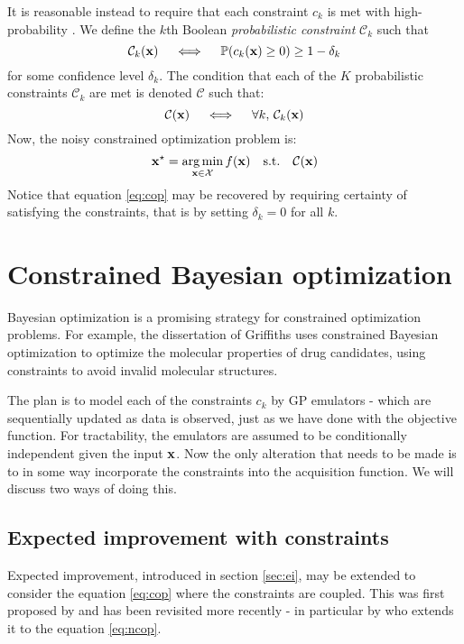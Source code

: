 It is reasonable instead to require that each constraint $c_k$ is met with high-probability \cite{gelbart}. We define the $k$th Boolean \textit{probabilistic constraint} $\mathcal{C}_k$ such that
%
\begin{equation}
\mathcal{C}_k(\mathbf{x}) \quad \iff \quad \mathbb{P}(c_{k}(\mathbf{x})\geq 0) \geq 1 - \delta_k
\end{equation}
%
for some confidence level $\delta_k$. The condition that each of the $K$ probabilistic constraints $\mathcal{C}_k$ are met is denoted $\mathcal{C}$ such that: 
%
\begin{equation}
\mathcal{C}(\mathbf{x}) \quad \iff \quad \forall k, \, \mathcal{C}_k(\mathbf{x})
\end{equation}
%
Now, the noisy constrained optimization problem is:
%
\begin{equation} \label{eq:ncop}
\mathbf{x}^\star = \operatorname*{arg\,min}_{\mathbf{x}\in\mathcal{X}} f(\mathbf{x})\quad
\mathrm{s.t.}\quad \mathcal{C}(\mathbf{x})
\end{equation}
%
Notice that equation \ref{eq:cop} may be recovered by requiring certainty of satisfying the constraints, that is by setting $\delta_k = 0$ for all $k$.

\section{Constrained Bayesian optimization}

Bayesian optimization is a promising strategy for constrained optimization problems. For example, the dissertation of Griffiths \citep{griffiths} uses constrained Bayesian optimization to optimize the molecular properties of drug candidates, using constraints to avoid invalid molecular structures.

The plan is to model each of the constraints $c_k$ by GP emulators - which are sequentially updated as data is observed, just as we have done with the objective function. For tractability, the emulators are assumed to be conditionally independent given the input $\mathbf{x}$. Now the only alteration that needs to be made is to in some way incorporate the constraints into the acquisition function. We will discuss two ways of doing this.

\subsection{Expected improvement with constraints}

Expected improvement, introduced in section \ref{sec:ei}, may be extended to consider the equation \ref{eq:cop} where the constraints are coupled. This was first proposed by \citet{schonlau1998global} and has been revisited more recently \cite{snoek2013bayesian} \cite{gardner2014bayesian} - in particular by \citet{gelbart} who extends it to the equation \ref{eq:ncop}. 

